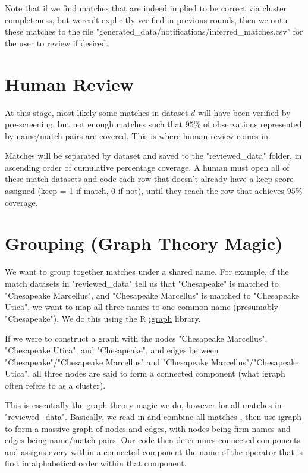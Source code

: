 \documentclass{article}
\begin{document}
Note that if we find matches that are indeed implied to be correct via cluster completeness, but weren't explicitly verified in previous rounds, then we outu these matches to the file "generated\_data/notifications/inferred\_matches.csv" for the user to review if desired. 

\section{Human Review}

At this stage, most likely some matches in dataset $d$ will have been verified by pre-screening, but not enough matches such that $95\%$ of observations represented by name/match pairs are covered. This is where human review comes in. 

Matches will be separated by dataset and saved to the "reviewed\_data" folder, in ascending order of cumulative percentage coverage. A human must open all of these match datasets and code each row that doesn't already have a keep score assigned (keep = 1 if match, 0 if not), until they reach the row that achieves $95\%$ coverage. 

\section{Grouping (Graph Theory Magic)}

We want to group together matches under a shared name. For example, if the match datasets in "reviewed\_data" tell us that "Chesapeake" is matched to "Chesapeake Marcellus", and "Chesapeake Marcellus" is matched to "Chesapeake Utica", we want to map all three names to one common name (presumably "Chesapeake"). We do this using the R \href{https://cran.r-project.org/web/packages/igraph/igraph.pdf}{igraph} library. 

If we were to construct a graph with the nodes "Chesapeake Marcellus", "Chesapeake Utica", and "Chesapeake", and edges between "Chesapeake"/"Chesapeake Marcellus" and "Chesapeake Marcellus"/"Chesapeake Utica", all three nodes are said to form a connected component (what igraph often refers to as a cluster). 

This is essentially the graph theory magic we do, however for all matches in "reviewed\_data". Basically, we read in and combine all matches , then use igraph to form a massive graph of nodes and edges, with nodes being firm names and edges being name/match pairs. Our code then determines connected components and assigns every within a connected component the name of the operator that is first in alphabetical order within that component. \\
\end{document}
